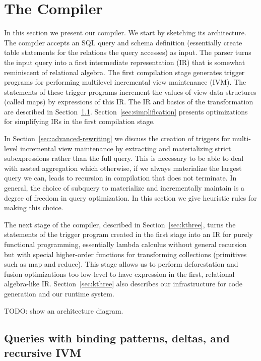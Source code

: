 \section{The Compiler}
\label{sec:compiler}


In this section we present our compiler. We start by sketching its architecture.
%
The compiler accepts an SQL query and schema definition (essentially create table statements for the relations the query accesses) as input. The parser turns the input query into a first intermediate representation (IR) that is somewhat reminiscent of relational algebra. The first compilation stage generates trigger programs for performing multilevel incremental view maintenance (IVM). The statements of these trigger programs increment the values of view data structures (called maps) by expressions of this IR. The IR and basics of the transformation are described in Section~\ref{sec:compiler_calc}. Section~\ref{sec:simplification} presents optimizations for simplifying IRs in the first compilation stage.

In Section~\ref{sec:advanced-rewriting} we discuss the creation of triggers for multi-level incremental view maintenance by extracting and materializing strict subexpressions rather than the full query. This is necessary to be able to deal with nested aggregation which otherwise, if we always materialize the largest query we can, leads to recursion in compilation that does not terminate. In general, the choice of subquery to materialize and incrementally maintain is a degree of freedom in query optimization. In this section we give heuristic rules for making this choice.

The next stage of the compiler, described in Section~\ref{sec:kthree}, turns the statements of the trigger program created in the first stage into an IR for purely functional programming, essentially lambda calculus without general recursion but with special higher-order functions for transforming collections (primitives such as map and reduce). This stage allows us to perform deforestation and fusion optimizations too low-level to have expression in the first, relational algebra-like IR.
Section~\ref{sec:kthree} also describes our infrastructure for code generation and our runtime system.

TODO: show an architecture diagram.




\subsection{Queries with binding patterns, deltas, and recursive IVM}
\label{sec:compiler_calc}


